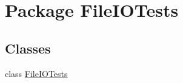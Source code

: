\hypertarget{namespace_file_i_o_tests}{}\section{Package File\+I\+O\+Tests}
\label{namespace_file_i_o_tests}
\subsection*{Classes}
\begin{DoxyCompactItemize}
\item 
class \hyperlink{class_file_i_o_tests_1_1_file_i_o_tests}{File\+I\+O\+Tests}
\end{DoxyCompactItemize}
